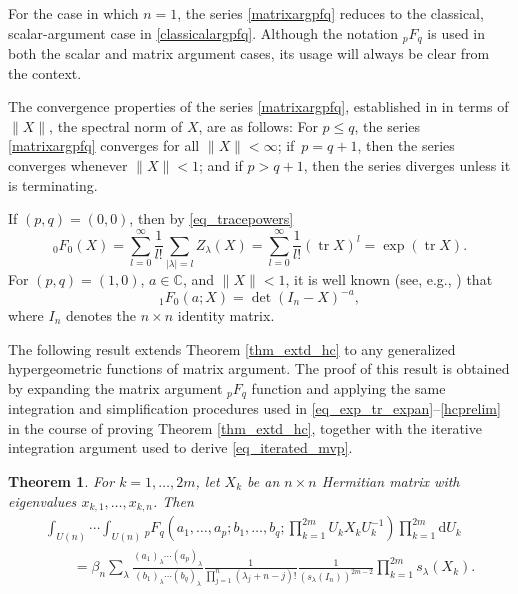 \documentclass[pdftex]{sigma}
\numberwithin{equation}{section}
\newtheorem{Theorem}{Theorem}[section]
\def\C{{\mathbb C}}
\def\dd{ \mathrm{d}}
\def\tr{\operatorname{tr} }
\begin{document}
For the case in which $n = 1$, the series \eqref{matrixargpfq} reduces to the classical, scalar-argument case in \eqref{classicalargpfq}. Although the notation ${}_pF_q$ is used in both the scalar and matrix argument cases, its usage will always be clear from the context.

The convergence properties of the series \eqref{matrixargpfq}, established in \cite[Section 6]{grossrichards87} in terms of $\|X\|$, the spectral norm of $X$, are as follows: For $p \le q$, the series \eqref{matrixargpfq} converges for all $\|X\| < \infty$; if~${p = q+1}$, then the series converges whenever $\|X\| < 1$; and if $p > q+1$, then the series diverges unless it is terminating.

If $(p,q) = (0,0)$, then by \eqref{eq_tracepowers}
\begin{equation}
\label{eq_0F0}
{}_0F_0(X) = \sum_{l=0}^\infty \frac{1}{l!} \sum_{|\lambda|=l} Z_\lambda(X) = \sum_{l=0}^\infty \frac{1}{l!} (\tr X)^l = \exp(\tr X).
\end{equation}
For $(p,q) = (1,0)$, $a \in \C$, and $\|X\| < 1$, it is well known (see, e.g., \cite{grossrichards87,grossrichards89}) that
\begin{equation}
\label{eq_1F0}
{}_1F_0(a;X) = \det(I_n-X)^{-a},
\end{equation}
where $I_n$ denotes the $n \times n$ identity matrix.

The following result extends Theorem \ref{thm_extd_hc} to any generalized hypergeometric functions of matrix argument. The proof of this result is obtained by expanding the matrix argument ${}_pF_q$ function and applying the same integration and simplification procedures used in \eqref{eq_exp_tr_expan}--\eqref{hcprelim} in the course of proving Theorem \ref{thm_extd_hc}, together with the iterative integration argument used to derive \eqref{eq_iterated_mvp}.

\begin{Theorem}
\label{ghf-extendedpfq}
For $k=1,\dots,2m$, let $X_k$ be an $n \times n$ Hermitian matrix with eigenvalues $x_{k,1},\dots,x_{k,n}$. Then
\begin{gather}
\int_{U(n)} \cdots \int_{U(n)} {}_pF_q\left(a_1,\dots,a_p;b_1,\dots,b_q;\prod_{k=1}^{2m} U_k X_k U_k^{-1}\right) \prod_{k=1}^{2m} \dd U_k \nonumber\\
\qquad= \beta_n \sum_\lambda \frac{(a_1)_\lambda \cdots (a_p)_\lambda}{(b_1)_\lambda \cdots (b_q)_\lambda} \frac{1}{\prod_{j=1}^n (\lambda_j + n-j)!} \frac{1}{(s_\lambda(I_n))^{2m-2}} \prod_{k=1}^{2m} s_\lambda(X_k).\label{hcextendedpfq}
\end{gather}
\end{Theorem}
\end{document}
